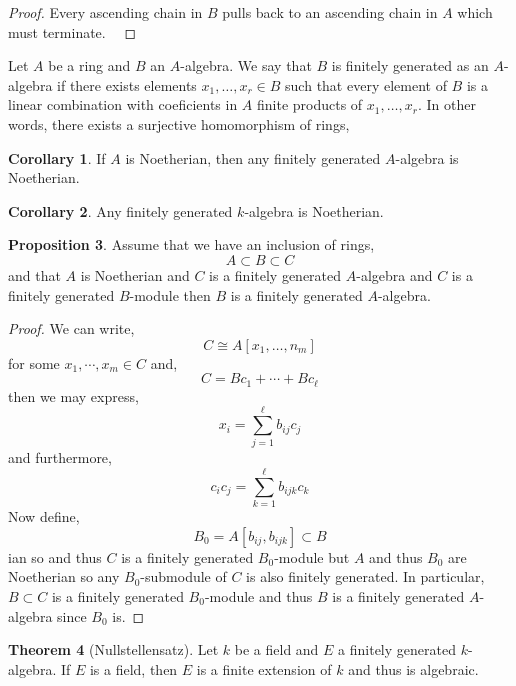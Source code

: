 \documentclass[12pt]{article}
\theoremstyle{remark}
\theoremstyle{definition}
\newtheorem{theorem}{Theorem}[section]
\newtheorem{proposition}[theorem]{Proposition}
\newtheorem{corollary}[theorem]{Corollary}
\newenvironment{definition}[1][Definition:]{\begin{trivlist}
\item[\hskip \labelsep {\bfseries #1}]}{\end{trivlist}}
\begin{document}
\begin{proof}
Every ascending chain in $B$ pulls back to an ascending chain in $A$ which must terminate. 
\
\end{proof}

\begin{definition}
Let $A$ be a ring and $B$ an $A$-algebra. We say that $B$ is finitely generated as an $A$-algebra if there exists elements $x_1, \dots, x_r \in B$ such that every element of $B$ is a linear combination with coeficients in $A$ finite products of $x_1, \dots, x_r$. In other words, there exists a surjective homomorphism of rings,
\begin{center}
\end{center}  
\end{definition}

\begin{corollary}
If $A$ is Noetherian, then 
any finitely generated $A$-algebra is Noetherian.
\end{corollary}

\begin{corollary}
Any finitely generated $k$-algebra is Noetherian.
\end{corollary}


\begin{proposition}
Assume that we have an inclusion of rings,
\[ A \subset B \subset C \]
and that $A$ is Noetherian and $C$ is a finitely generated $A$-algebra and $C$ is a finitely generated $B$-module then $B$ is a finitely generated $A$-algebra. 
\end{proposition}

\begin{proof}
We can write,
\[ C \cong A[x_1, \dots, n_m] \]
for some $x_1, \cdots, x_m \in C$ and,
\[ C = B c_1 + \cdots + B c_{\ell} \]
then we may express,
\[ x_i  = \sum_{j = 1}^{\ell} b_{ij} c_j \]
and furthermore,
\[ c_i c_j = \sum_{k = 1}^{\ell} b_{ijk} c_k \]
Now define,
\[ B_0 = A[b_{ij}, b_{ijk} ] \subset B \]ian so 
and thus $C$ is a finitely generated $B_0$-module but $A$ and thus $B_0$ are Noetherian so any $B_0$-submodule of $C$ is also finitely generated. In particular, $B \subset C$ is a finitely generated $B_0$-module and thus $B$ is a finitely generated $A$-algebra since $B_0$ is. 
\end{proof}

\begin{theorem}[Nullstellensatz]
Let $k$ be a field and $E$ a finitely generated $k$-algebra. If $E$ is a field, then $E$ is a finite extension of $k$ and thus is algebraic. 
\end{theorem}
\end{document}
